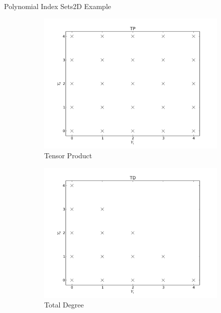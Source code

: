 \documentclass{beamer}
\begin{document}
\begin{frame}{Polynomial Index Sets}{2D Example}\vspace{-20pt}
\begin{figure}[H]
\centering
  \begin{subfigure}[b]{0.32 \textwidth}
   \includegraphics[width=\textwidth]{../graphics/TP}
   \caption{Tensor Product}
   \label{TP}
  \end{subfigure}
  \begin{subfigure}[b]{0.32 \textwidth}
   \includegraphics[width=\textwidth]{../graphics/TD}
   \caption{Total Degree}
   \label{TD}
  \end{subfigure}
  \begin{subfigure}[b]{0.32 \textwidth}

\end{subfigure}
\end{figure}
\end{frame}
\end{document}

